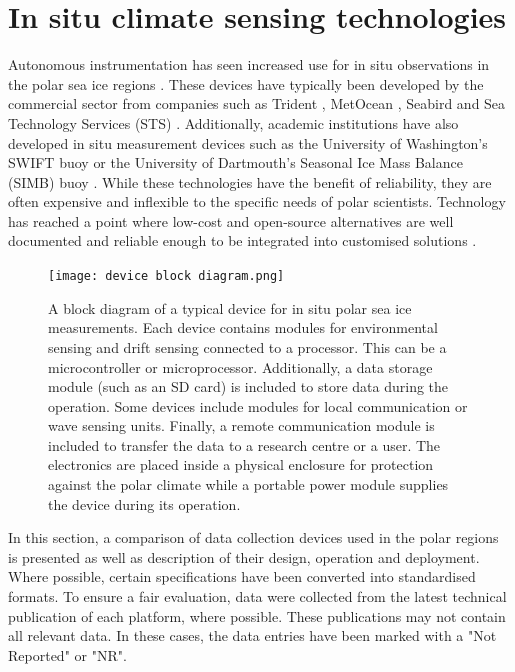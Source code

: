 \section{In situ climate sensing technologies}

Autonomous instrumentation has seen increased use for in situ observations in the polar sea ice regions \cite{kennicutt2016delivering}. These devices have typically  been developed by the commercial sector \cite{rabault2017measurements} from companies such as Trident \cite{trident}, MetOcean \cite{uptempo}, Seabird \cite{seabird2021website} and Sea Technology Services (STS) \cite{sts2021website}. Additionally, academic institutions have also developed in situ measurement devices such as the University of Washington's SWIFT buoy \cite{thomson2012wave} or the University of Dartmouth's Seasonal Ice Mass Balance (SIMB) buoy \cite{polashenski2011seasonal}. While these technologies have the benefit of reliability, they are often expensive \cite{rabault2017measurements} and inflexible to the specific needs of polar scientists. Technology has reached a point where low-cost and open-source alternatives are well documented and reliable enough to be integrated into customised solutions \cite{rabault2019open}.\par 

\begin{figure}[H]
	\centering
	\texttt{[image: device block diagram.png]}
	\caption{A block diagram of a typical device for in situ polar sea ice measurements. Each device contains modules for environmental sensing and drift sensing connected to a processor. This can be a microcontroller or microprocessor. Additionally, a data storage module (such as an SD card) is included to store data during the operation. Some devices include modules for local communication or wave sensing units. Finally, a remote communication module is included to transfer the data to a research centre or a user. The electronics are placed inside a physical enclosure for protection against the polar climate while a portable power module supplies the device during its operation.}
	\label{fig:devblockdiag}
\end{figure}

In this section, a comparison of data collection devices used in the polar regions is presented as well as  description of their design, operation and deployment. Where possible, certain specifications have been converted into standardised formats. To ensure a fair evaluation, data were collected from the latest technical publication of each platform, where possible. These publications may not contain all relevant data. In these cases, the data entries have been marked with a "Not Reported" or "NR". 


